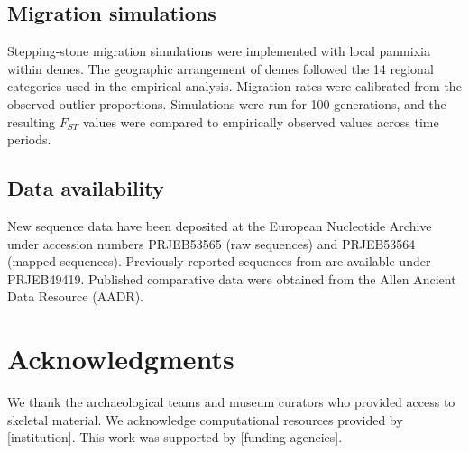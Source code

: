 \documentclass[11pt]{article}
\begin{document}
\subsection{Migration simulations}

Stepping-stone migration simulations were implemented with local panmixia within demes. The geographic arrangement of demes followed the 14 regional categories used in the empirical analysis. Migration rates were calibrated from the observed outlier proportions. Simulations were run for 100 generations, and the resulting $F_{ST}$ values were compared to empirically observed values across time periods.

\subsection{Data availability}

New sequence data have been deposited at the European Nucleotide Archive under accession numbers PRJEB53565 (raw sequences) and PRJEB53564 (mapped sequences). Previously reported sequences from \citet{Moots2023} are available under PRJEB49419. Published comparative data were obtained from the Allen Ancient Data Resource (AADR).

\section{Acknowledgments}

We thank the archaeological teams and museum curators who provided access to skeletal material. We acknowledge computational resources provided by [institution]. This work was supported by [funding agencies].



\end{document}
